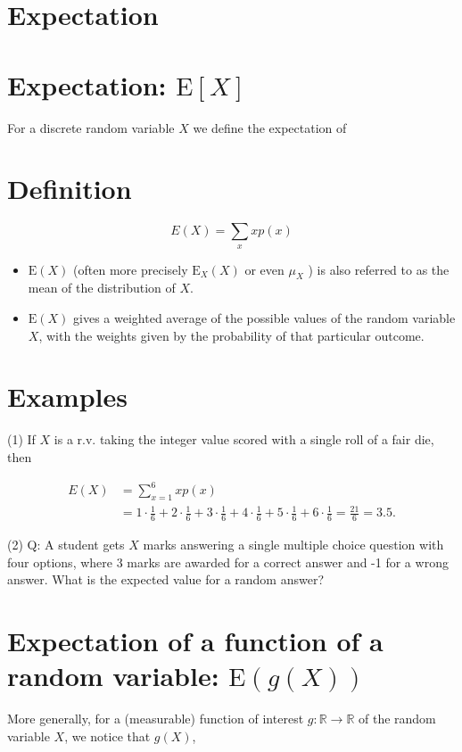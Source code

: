 \documentclass[10pt]{article}
\begin{document}
\section*{Expectation}
\section*{Expectation: $\mathrm{E}[X]$}
For a discrete random variable $X$ we define the expectation of

\section*{Definition}
$$
E(X)=\sum_{x} x p(x)
$$

\begin{itemize}
  \item $\mathrm{E}(X)$ (often more precisely $\mathrm{E}_{X}(X)$ or even $\mu_{X}$ ) is also referred to as the mean of the distribution of $X$.
  \item $\mathrm{E}(X)$ gives a weighted average of the possible values of the random variable $X$, with the weights given by the probability of that particular outcome.
\end{itemize}

\section*{Examples}
(1) If $X$ is a r.v. taking the integer value scored with a single roll of a fair die, then

$$
\begin{aligned}
E(X) & =\sum_{x=1}^{6} x p(x) \\
& =1 \cdot \frac{1}{6}+2 \cdot \frac{1}{6}+3 \cdot \frac{1}{6}+4 \cdot \frac{1}{6}+5 \cdot \frac{1}{6}+6 \cdot \frac{1}{6}=\frac{21}{6}=3.5 .
\end{aligned}
$$

(2) Q: A student gets $X$ marks answering a single multiple choice question with four options, where 3 marks are awarded for a correct answer and -1 for a wrong answer. What is the expected value for a random answer?

\section*{Expectation of a function of a random variable: $\mathrm{E}(g(X))$}
More generally, for a (measurable) function of interest $g: \mathbb{R} \rightarrow \mathbb{R}$ of the random variable $X$, we notice that $g(X)$,
\end{document}
